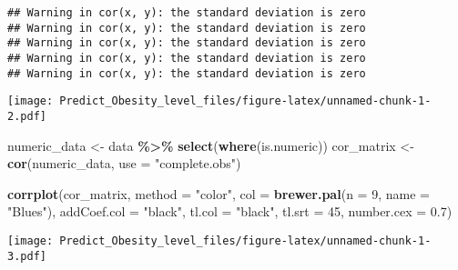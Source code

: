 \documentclass[
]{article}
\newenvironment{Shaded}{\begin{snugshade}}{\end{snugshade}}
\newcommand{\AttributeTok}[1]{\textcolor[rgb]{0.13,0.29,0.53}{#1}}
\newcommand{\DecValTok}[1]{\textcolor[rgb]{0.00,0.00,0.81}{#1}}
\newcommand{\FloatTok}[1]{\textcolor[rgb]{0.00,0.00,0.81}{#1}}
\newcommand{\FunctionTok}[1]{\textcolor[rgb]{0.13,0.29,0.53}{\textbf{#1}}}
\newcommand{\NormalTok}[1]{#1}
\newcommand{\OtherTok}[1]{\textcolor[rgb]{0.56,0.35,0.01}{#1}}
\newcommand{\SpecialCharTok}[1]{\textcolor[rgb]{0.81,0.36,0.00}{\textbf{#1}}}
\newcommand{\StringTok}[1]{\textcolor[rgb]{0.31,0.60,0.02}{#1}}
\begin{document}
\begin{verbatim}
## Warning in cor(x, y): the standard deviation is zero
## Warning in cor(x, y): the standard deviation is zero
## Warning in cor(x, y): the standard deviation is zero
## Warning in cor(x, y): the standard deviation is zero
## Warning in cor(x, y): the standard deviation is zero
\end{verbatim}

\texttt{[image: Predict\_Obesity\_level\_files/figure-latex/unnamed-chunk-1-2.pdf]}

\begin{Shaded}
\begin{Highlighting}[]
\NormalTok{numeric\_data }\OtherTok{\textless{}{-}}\NormalTok{ data }\SpecialCharTok{\%\textgreater{}\%} 
\FunctionTok{select}\NormalTok{(}\FunctionTok{where}\NormalTok{(is.numeric))}
\NormalTok{cor\_matrix }\OtherTok{\textless{}{-}} \FunctionTok{cor}\NormalTok{(numeric\_data, }\AttributeTok{use =} \StringTok{"complete.obs"}\NormalTok{)}
         

\FunctionTok{corrplot}\NormalTok{(cor\_matrix, }\AttributeTok{method =} \StringTok{"color"}\NormalTok{, }\AttributeTok{col =} \FunctionTok{brewer.pal}\NormalTok{(}\AttributeTok{n =} \DecValTok{9}\NormalTok{, }\AttributeTok{name =} \StringTok{"Blues"}\NormalTok{),}
         \AttributeTok{addCoef.col =} \StringTok{"black"}\NormalTok{, }\AttributeTok{tl.col =} \StringTok{"black"}\NormalTok{, }\AttributeTok{tl.srt =} \DecValTok{45}\NormalTok{, }\AttributeTok{number.cex =} \FloatTok{0.7}\NormalTok{)}
\end{Highlighting}
\end{Shaded}

\texttt{[image: Predict\_Obesity\_level\_files/figure-latex/unnamed-chunk-1-3.pdf]}
\end{document}
